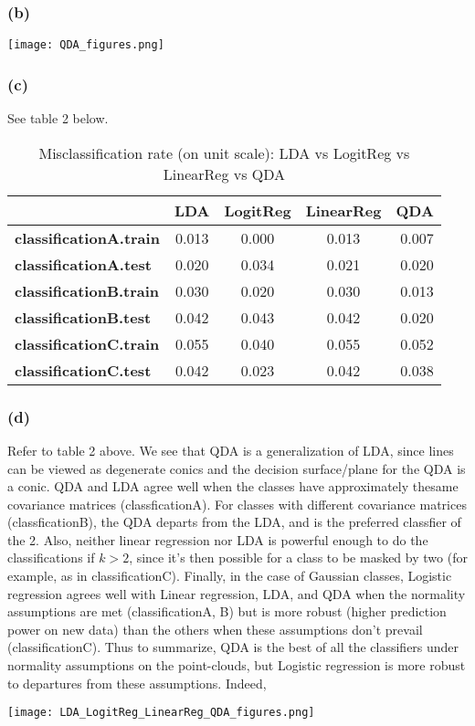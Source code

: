 \documentclass[9pt]{article}
\begin{document}
\subsubsection{(b)}
\begin{center}
\texttt{[image: QDA\_figures.png]}
\end{center}

\subsubsection{(c)}
See table 2 below.
\begin{table}
\centering
\caption{Misclassification rate (on unit scale): LDA vs LogitReg vs LinearReg vs QDA}
\begin{tabular}{|l|| c|c|c| r|}
  \hline
      \textbf{ } & \textbf{LDA} & \textbf{LogitReg} & \textbf{LinearReg} & \textbf{QDA}\\
\hline\hline

  \textbf{classificationA.train} & 0.013 & 0.000 & 0.013 & 0.007\\
\hline
\textbf{classificationA.test} & 0.020 & 0.034 & 0.021 & 0.020\\
\hline
\textbf{classificationB.train} & 0.030 & 0.020 & 0.030 & 0.013\\
\hline
\textbf{classificationB.test} & 0.042 & 0.043 & 0.042 & 0.020\\
\hline
\textbf{classificationC.train} & 0.055 & 0.040 & 0.055 & 0.052\\
\hline
\textbf{classificationC.test} & 0.042 & 0.023 & 0.042 & 0.038\\
  \hline
\end{tabular}

\end{table}

\subsubsection{(d)}
Refer to table 2 above. We see that QDA is a generalization of LDA, since lines can be viewed as degenerate conics and the decision surface/plane for the QDA is a conic. QDA and LDA agree well when the classes have approximately thesame covariance matrices (classficationA). For classes with different covariance matrices (classficationB), the QDA departs from the LDA, and is the preferred classfier of the 2. Also, neither linear regression nor LDA is powerful enough to do the classifications if $k > 2$, since it’s then possible for a class to be masked by two (for example, as in classificationC). Finally, in the case of Gaussian classes, Logistic regression agrees well with Linear regression, LDA, and QDA when the normality assumptions are met (classificationA, B)  but is more robust (higher prediction power on new data) than the others when these assumptions don't prevail (classificationC). Thus to summarize, QDA is the best of all the classifiers under normality assumptions on the point-clouds, but Logistic regression is more robust to departures from these assumptions. Indeed,

\centering
\texttt{[image: LDA\_LogitReg\_LinearReg\_QDA\_figures.png]}
\end{document}

